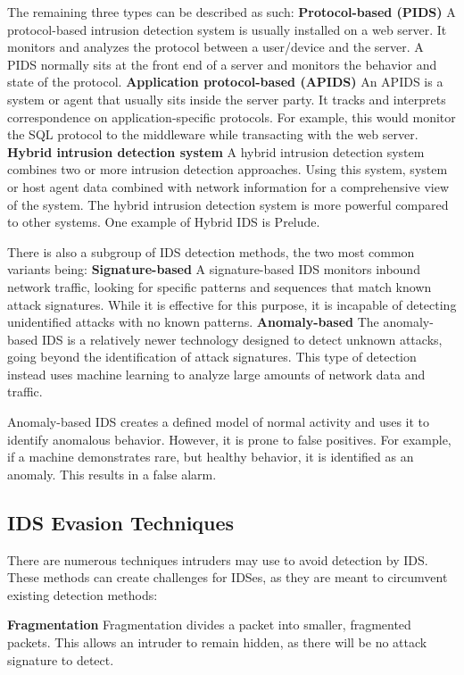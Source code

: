 The remaining three types can be described as such:
\textbf{Protocol-based (PIDS)}
A protocol-based intrusion detection system is usually installed on a web server. It monitors and analyzes the protocol between a user/device and the server. A PIDS normally sits at the front end of a server and monitors the behavior and state of the protocol.
\textbf{Application protocol-based (APIDS)}
An APIDS is a system or agent that usually sits inside the server party. It tracks and interprets correspondence on application-specific protocols. For example, this would monitor the SQL protocol to the middleware while transacting with the web server.
\textbf{Hybrid intrusion detection system}
A hybrid intrusion detection system combines two or more intrusion detection approaches. Using this system, system or host agent data combined with network information for a comprehensive view of the system. The hybrid intrusion detection system is more powerful compared to other systems. One example of Hybrid IDS is Prelude.

There is also a subgroup of IDS detection methods, the two most common variants being:
\textbf{Signature-based}
A signature-based IDS monitors inbound network traffic, looking for specific patterns and sequences that match known attack signatures. While it is effective for this purpose, it is incapable of detecting unidentified attacks with no known patterns.
\textbf{Anomaly-based}
The anomaly-based IDS is a relatively newer technology designed to detect unknown attacks, going beyond the identification of attack signatures. This type of detection instead uses machine learning to analyze large amounts of network data and traffic.

Anomaly-based IDS creates a defined model of normal activity and uses it to identify anomalous behavior. However, it is prone to false positives. For example, if a machine demonstrates rare, but healthy behavior, it is identified as an anomaly. This results in a false alarm.

\subsection{IDS Evasion Techniques}

There are numerous techniques intruders may use to avoid detection by IDS. These methods can create challenges for IDSes, as they are meant to circumvent existing detection methods:

\textbf{Fragmentation}
Fragmentation divides a packet into smaller, fragmented packets. This allows an intruder to remain hidden, as there will be no attack signature to detect.

